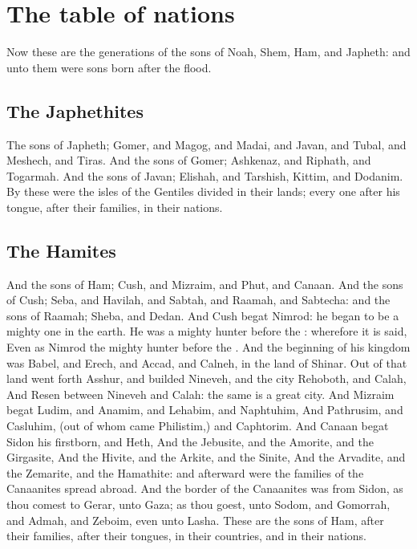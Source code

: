 \section*{The table of nations}
\begin{biblechapter} %
\verse Now these are the generations of the sons of Noah, Shem, Ham, and Japheth: and unto them were sons born after the flood.
\subsection*{The Japhethites}
\verse The sons of Japheth; Gomer, and Magog, and Madai, and Javan, and Tubal, and Meshech, and Tiras.
\verse And the sons of Gomer; Ashkenaz, and Riphath, and Togarmah.
\verse And the sons of Javan; Elishah, and Tarshish, Kittim, and Dodanim.
\verse By these were the isles of the Gentiles divided in their lands; every one after his tongue, after their families, in their nations.
\subsection*{The Hamites}
\verse And the sons of Ham; Cush, and Mizraim, and Phut, and Canaan.
\verse And the sons of Cush; Seba, and Havilah, and Sabtah, and Raamah, and Sabtecha: and the sons of Raamah; Sheba, and Dedan.
\verse And Cush begat Nimrod: he began to be a mighty one in the earth.
\verse He was a mighty hunter before the \LORD: wherefore it is said, Even as Nimrod the mighty hunter before the \LORD.
\verse And the beginning of his kingdom was Babel, and Erech, and Accad, and Calneh, in the land of Shinar.
\verse Out of that land went forth Asshur, and builded Nineveh, and the city Rehoboth, and Calah,
\verse And Resen between Nineveh and Calah: the same is a great city.
\verse And Mizraim begat Ludim, and Anamim, and Lehabim, and Naphtuhim,
\verse And Pathrusim, and Casluhim, (out of whom came Philistim,) and Caphtorim.
\verse And Canaan begat Sidon his firstborn, and Heth,
\verse And the Jebusite, and the Amorite, and the Girgasite,
\verse And the Hivite, and the Arkite, and the Sinite,
\verse And the Arvadite, and the Zemarite, and the Hamathite: and afterward were the families of the Canaanites spread abroad.
\verse And the border of the Canaanites was from Sidon, as thou comest to Gerar, unto Gaza; as thou goest, unto Sodom, and Gomorrah, and Admah, and Zeboim, even unto Lasha.
\verse These are the sons of Ham, after their families, after their tongues, in their countries, and in their nations.

\end{biblechapter}
